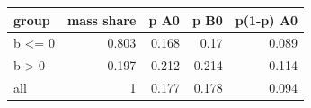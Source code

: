 \begin{tabular}{lrrrr}
\toprule
group & mass share & p A0 & p B0 & p(1-p) A0 \\
\midrule
b <= 0 & 0.803 & 0.168 & 0.17 & 0.089 \\
b > 0 & 0.197 & 0.212 & 0.214 & 0.114 \\
all & 1 & 0.177 & 0.178 & 0.094 \\
\bottomrule
\end{tabular}

